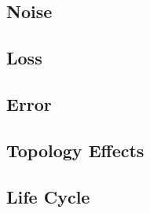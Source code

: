 \subsection{Noise}
\subsection{Loss}
\subsection{Error}
\subsection{Topology Effects}
\subsection{Life Cycle}

